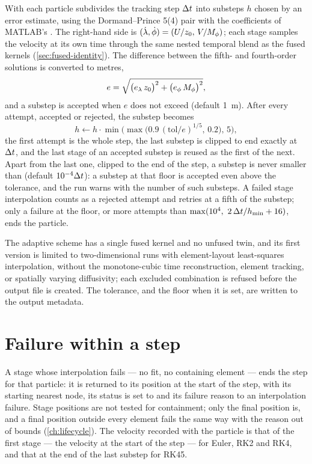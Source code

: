 With  each particle subdivides the tracking step $\Delta t$ into substeps $h$ chosen
by an error estimate, using the Dormand--Prince 5(4) pair with the coefficients of MATLAB's
. The right-hand side is $(\dot{\lambda},\dot{\phi})=(U/z_{0},\,V/M_{\phi})$; each stage samples the
velocity at its own time through the same nested temporal blend as the fused kernels
(\cref{sec:fused-identity}). The difference between the fifth- and fourth-order solutions is converted to
metres,
\begin{equation}\label{eq:rk45-err}
  e=\sqrt{\bigl(e_\lambda\,z_{0}\bigr)^2+\bigl(e_\phi\,M_{\phi}\bigr)^2},
\end{equation}
and a substep is accepted when $e$ does not exceed  (default \SI{1}{\metre}). After
every attempt, accepted or rejected, the substep becomes
\begin{equation}\label{eq:rk45-control}
  h \leftarrow h\cdot\min\bigl(\max\bigl(0.9\,(\mathrm{tol}/e)^{1/5},\,0.2\bigr),\,5\bigr),
\end{equation}
the first attempt is the whole step, the last substep is clipped to end exactly at $\Delta t$, and the last
stage of an accepted substep is reused as the first of the next. Apart from the last one, clipped to the end of the step, a
substep is never smaller than  (default $10^{-4}\Delta t$): a substep at that floor is accepted even above the tolerance,
and the run warns with the number of such substeps. A failed stage interpolation counts as a rejected
attempt and retries at a fifth of the substep; only a failure at the floor, or more attempts than
$\max(10^4,\ 2\,\Delta t/h_{\min}+16)$, ends the particle.

The adaptive scheme has a single fused kernel and no unfused twin, and its first version is limited to
two-dimensional runs with element-layout least-squares interpolation, without the monotone-cubic time
reconstruction, element tracking, or spatially varying diffusivity; each excluded combination is refused
before the output file is created. The tolerance, and the floor when it is set, are written to the output
metadata.

\section{Failure within a step}\label{sec:int-failure}

A stage whose interpolation fails --- no fit, no containing element --- ends the step for that particle:
it is returned to its position at the start of the step, with its starting nearest node, its status is set
to  and its failure reason to an interpolation failure. Stage positions are not tested for
containment; only the final position is, and a final position outside every element fails the same way
with the reason out of bounds (\cref{ch:lifecycle}). The velocity recorded with the particle is that of
the first stage --- the velocity at the start of the step --- for Euler, RK2 and RK4, and that at the end of
the last substep for RK45.


